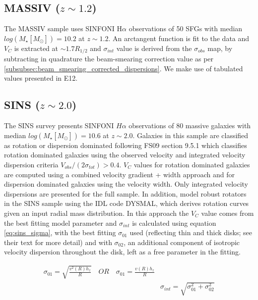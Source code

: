 \documentclass[fleqn,usenatbib]{mn2e}
\begin{document}
\subsection{MASSIV ($z\sim1.2$)}\label{subsec:MASSIV}
The MASSIV sample \citep[E12]{Epinat2012} uses SINFONI H$\alpha$ observations of 50 SFGs with median $log(M_{\star}[M_{\odot}])=10.2$ at $z\sim1.2$.
An arctangent function is fit to the data and $V_{C}$ is extracted at $\sim1.7R_{1/2}$ and $\sigma_{int}$ value is derived from the $\sigma_{obs}$ map, by subtracting in quadrature the beam-smearing correction value as per \cref{subsubsec:beam_smearing_corrected_dispersions}.
We make use of tabulated values presented in E12.

\subsection{SINS ($z\sim2.0$)}\label{subsec:SINS}
The SINS survey \citep[FS09]{ForsterSchreiber2009} presents SINFONI $H\alpha$ observations of 80 massive galaxies with median $log(M_{\star}[M_{\odot}])=10.6$ at $z\sim2.0$.
Galaxies in this sample are classified as rotation or dispersion dominated following FS09 section 9.5.1 which classifies rotation dominated galaxies using the observed velocity and integrated velocity dispersion criteria $V_{obs}/(2\sigma_{tot}) > 0.4$.
$V_{C}$ values for rotation dominated galaxies are computed using a combined velocity gradient + width approach \citep{ForsterSchreiber2006} and for dispersion dominated galaxies using the velocity width.
Only integrated velocity dispersions are presented for the full sample.
In addition, \cite[C09]{Cresci2009} model robust rotators in the SINS sample using the IDL code DYSMAL, which derives rotation curves given an input radial mass distribution.
In this approach the $V_{C}$ value comes from the best fitting model parameter and $\sigma_{int}$ is calculated using equation \ref{eq:sins_sigma}, with the best fitting $\sigma_{01}$ used (reflecting thin and thick disks; see their text for more detail) and with $\sigma_{02}$, an additional component of isotropic velocity dispersion throughout the disk, left as a free parameter in the fitting.

\begin{equation}\label{eq:sins_sigma}
\begin{split}
\sigma_{01} = \sqrt{\frac{v^{2}(R)h_{z}}{R}} \quad OR \quad \sigma_{01} = \frac{v(R)h_{z}}{R} \\
& \sigma_{int} = \sqrt{\sigma_{01}^{2} + \sigma_{02}^{2}}
\end{split}
\end{equation}
\end{document}
